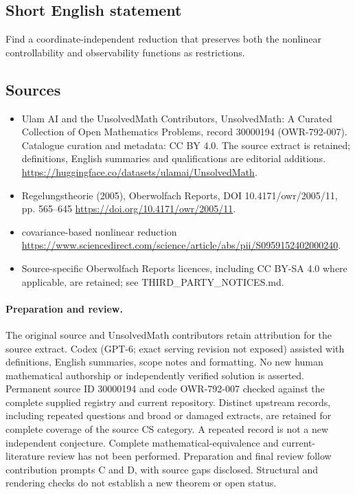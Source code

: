 \documentclass[11pt]{article}
\begin{document}
\subsection{Short English statement}
Find a coordinate-independent reduction that preserves both the nonlinear controllability and observability functions as restrictions.
\subsection{Sources}
\begin{itemize}
\item[\hypertarget{source:30000194:1}{S1}] Ulam AI and the UnsolvedMath Contributors, UnsolvedMath: A Curated Collection of Open Mathematics Problems, record 30000194 (OWR-792-007). Catalogue curation and metadata: CC BY 4.0. The source extract is retained; definitions, English summaries and qualifications are editorial additions.
\url{https://huggingface.co/datasets/ulamai/UnsolvedMath}.
\item[\hypertarget{source:30000194:2}{S2}] Regelungstheorie (2005), Oberwolfach Reports, DOI 10.4171/owr/2005/11, pp. 565--645
\url{https://doi.org/10.4171/owr/2005/11}.
\item[\hypertarget{source:30000194:3}{S3}] covariance-based nonlinear reduction
\url{https://www.sciencedirect.com/science/article/abs/pii/S0959152402000240}.
\item Source-specific Oberwolfach Reports licences, including CC BY-SA 4.0 where applicable, are retained; see THIRD\_PARTY\_NOTICES.md.
\end{itemize}
\paragraph{Preparation and review.}
The original source and UnsolvedMath contributors retain attribution for the source extract. Codex (GPT-6; exact serving revision not exposed) assisted with definitions, English summaries, scope notes and formatting. No new human mathematical authorship or independently verified solution is asserted. Permanent source ID 30000194 and code OWR-792-007 checked against the complete supplied registry and current repository. Distinct upstream records, including repeated questions and broad or damaged extracts, are retained for complete coverage of the source CS category. A repeated record is not a new independent conjecture. Complete mathematical-equivalence and current-literature review has not been performed. Preparation and final review follow contribution prompts C and D, with source gaps disclosed. Structural and rendering checks do not establish a new theorem or open status.
\label{end:30000194}
\end{document}
